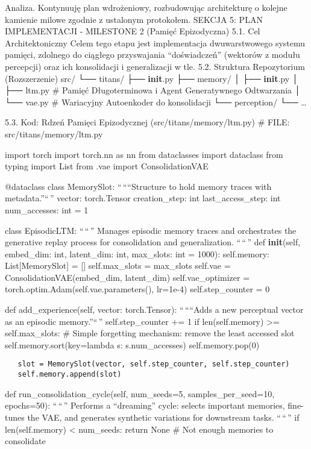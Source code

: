 \documentclass[letterpaper,twocolumn]{article}
\author{}
\date{}
\begin{document}
Analiza. Kontynuuję plan wdrożeniowy, rozbudowując architekturę o
kolejne kamienie milowe zgodnie z ustalonym protokołem. SEKCJA 5: PLAN
IMPLEMENTACJI - MILESTONE 2 (Pamięć Epizodyczna) 5.1. Cel
Architektoniczny Celem tego etapu jest implementacja dwuwarstwowego
systemu pamięci, zdolnego do ciągłego przyswajania ``doświadczeń''
(wektorów z modułu percepcji) oraz ich konsolidacji i generalizacji w
tle. 5.2. Struktura Repozytorium (Rozszerzenie) src/ └── titans/ ├──
\textbf{init}.py ├── memory/ │ ├── \textbf{init}.py │ ├── ltm.py \#
Pamięć Długoterminowa i Agent Generatywnego Odtwarzania │ └── vae.py \#
Wariacyjny Autoenkoder do konsolidacji └── perception/ └── \ldots{}

5.3. Kod: Rdzeń Pamięci Epizodycznej (src/titans/memory/ltm.py) \# FILE:
src/titans/memory/ltm.py

import torch import torch.nn as nn from dataclasses import dataclass
from typing import List from .vae import ConsolidationVAE

@dataclass class MemorySlot: ``\,````Structure to hold memory traces
with metadata.''``\,'' vector: torch.Tensor creation\_step: int
last\_access\_step: int num\_accesses: int = 1

class EpisodicLTM: ``\,``\,'' Manages episodic memory traces and
orchestrates the generative replay process for consolidation and
generalization. ``\,``\,'' def \textbf{init}(self, embed\_dim: int,
latent\_dim: int, max\_slots: int = 1000): self.memory:
List{[}MemorySlot{]} = {[}{]} self.max\_slots = max\_slots self.vae =
ConsolidationVAE(embed\_dim, latent\_dim) self.vae\_optimizer =
torch.optim.Adam(self.vae.parameters(), lr=1e-4) self.step\_counter = 0

def add\_experience(self, vector: torch.Tensor): ``\,````Adds a new
perceptual vector as an episodic memory.''``\,'' self.step\_counter += 1
if len(self.memory) \textgreater= self.max\_slots: \# Simple forgetting
mechanism: remove the least accessed slot self.memory.sort(key=lambda s:
s.num\_accesses) self.memory.pop(0)

\begin{verbatim}
   slot = MemorySlot(vector, self.step_counter, self.step_counter)
   self.memory.append(slot)
\end{verbatim}

def run\_consolidation\_cycle(self, num\_seeds=5, samples\_per\_seed=10,
epochs=50): ``\,``\,'' Performs a ``dreaming'' cycle: selects important
memories, fine-tunes the VAE, and generates synthetic variations for
downstream tasks. ``\,``\,'' if len(self.memory) \textless{} num\_seeds:
return None \# Not enough memories to consolidate
\end{document}

